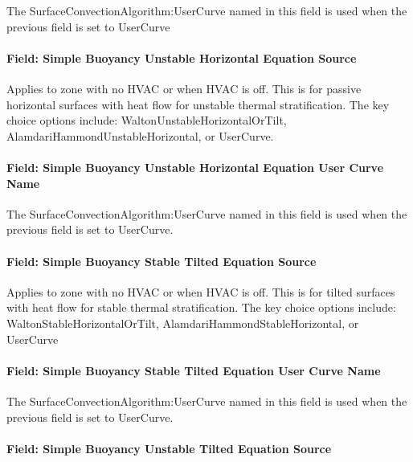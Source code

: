 The SurfaceConvectionAlgorithm:UserCurve named in this field is used when the previous field is set to UserCurve

\paragraph{Field: Simple Buoyancy Unstable Horizontal Equation Source}\label{field-simple-buoyancy-unstable-horizontal-equation-source}

Applies to zone with no HVAC or when HVAC is off. This is for passive horizontal surfaces with heat flow for unstable thermal stratification. The key choice options include: WaltonUnstableHorizontalOrTilt, AlamdariHammondUnstableHorizontal, or UserCurve.

\paragraph{Field: Simple Buoyancy Unstable Horizontal Equation User Curve Name}\label{field-simple-buoyancy-unstable-horizontal-equation-user-curve-name}

The SurfaceConvectionAlgorithm:UserCurve named in this field is used when the previous field is set to UserCurve.

\paragraph{Field: Simple Buoyancy Stable Tilted Equation Source}\label{field-simple-buoyancy-stable-tilted-equation-source}

Applies to zone with no HVAC or when HVAC is off. This is for tilted surfaces with heat flow for stable thermal stratification. The key choice options include: WaltonStableHorizontalOrTilt, AlamdariHammondStableHorizontal, or UserCurve

\paragraph{Field: Simple Buoyancy Stable Tilted Equation User Curve Name}\label{field-simple-buoyancy-stable-tilted-equation-user-curve-name}

The SurfaceConvectionAlgorithm:UserCurve named in this field is used when the previous field is set to UserCurve.

\paragraph{Field: Simple Buoyancy Unstable Tilted Equation Source}\label{field-simple-buoyancy-unstable-tilted-equation-source}

